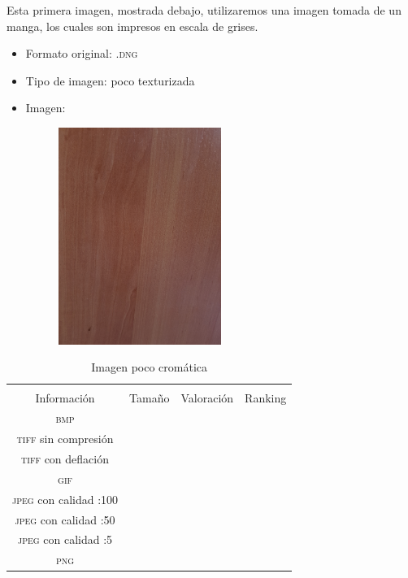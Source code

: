 \documentclass[11pt,a4paper]{article}
\begin{document}
Esta primera imagen, mostrada debajo, utilizaremos una imagen tomada de un manga, los cuales son impresos en escala de grises.

\begin{itemize}
	\item Formato original: \textsc{.dng}
	\item Tipo de imagen: poco texturizada
	\item Imagen:
		\begin{figure}[H]
		\centering
			\includegraphics[width=0.5\textwidth]{Fotos/pocas_texturas.jpg}
		\end{figure}	
\end{itemize}

\begin{table}[H]
\centering
\begin{tabular}{|c|c|c|c|}
\hline
\diagbox[width=15em]{\textit{Códec}/Formato}{\\Información} & Tamaño & Valoración & Ranking \\
\hline
\textsc{bmp} &  &  &  \\ \hline
\textsc{tiff} sin compresión &  &  &  \\ \hline
\textsc{tiff} con deflación &  &  &  \\ \hline
\textsc{gif} &  &  &  \\ \hline
\textsc{jpeg} con calidad :100 &  &  &  \\ \hline
\textsc{jpeg} con calidad :50 &  &  &  \\ \hline
\textsc{jpeg} con calidad :5 &  &  &  \\ \hline
\textsc{png} &  &  &  \\ \hline
\end{tabular}
\caption{Imagen poco cromática}
\label{tab:my-table}
\end{table}
\end{document}
